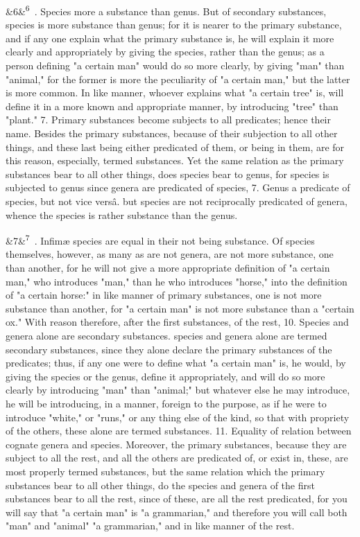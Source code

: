 \documentclass[12pt]{article}
\newcommand{\para}[1][]{\par\noindent\ifx&#1&\else\textsuperscript{\footnotesize #1}~\fi}
\begin{document}
\para[6] 6. Species more a substance than genus. But of secondary substances, species is more substance than genus; for it is nearer to the primary substance, and if any one explain what the primary substance is, he will explain it more clearly and appropriately by giving the species, rather than the genus; as a person defining "a certain man" would do so more clearly, by giving "man" than "animal," for the former is more the peculiarity of "a certain man," but the latter is more common. In like manner, whoever explains what "a certain tree" is, will define it in a more known and appropriate manner, by introducing "tree" than "plant." 7. Primary substances become subjects to all predicates; hence their name. Besides the primary substances, because of their subjection to all other things, and these last being either predicated of them, or being in them, are for this reason, especially, termed substances. Yet the same relation as the primary substances bear to all other things, does species bear to genus, for species is subjected to genus since genera are predicated of species, 7. Genus a predicate of species, but not vice versâ. but species are not reciprocally predicated of genera, whence the species is rather substance than the genus.

\para[7] 9. Infimæ species are equal in their not being substance. Of species themselves, however, as many as are not genera, are not more substance, one than another, for he will not give a more appropriate definition of "a certain man," who introduces "man," than he who introduces "horse," into the definition of "a certain horse:" in like manner of primary substances, one is not more substance than another, for "a certain man" is not more substance than a "certain ox." With reason therefore, after the first substances, of the rest, 10. Species and genera alone are secondary substances. species and genera alone are termed secondary substances, since they alone declare the primary substances of the predicates; thus, if any one were to define what "a certain man" is, he would, by giving the species or the genus, define it appropriately, and will do so more clearly by introducing "man" than "animal;" but whatever else he may introduce, he will be introducing, in a manner, foreign to the purpose, as if he were to introduce "white," or "runs," or any thing else of the kind, so that with propriety of the others, these alone are termed substances. 11. Equality of relation between cognate genera and species. Moreover, the primary substances, because they are subject to all the rest, and all the others are predicated of, or exist in, these, are most properly termed substances, but the same relation which the primary substances bear to all other things, do the species and genera of the first substances bear to all the rest, since of these, are all the rest predicated, for you will say that "a certain man" is "a grammarian," and therefore you will call both "man" and "animal" "a grammarian," and in like manner of the rest.
\end{document}
